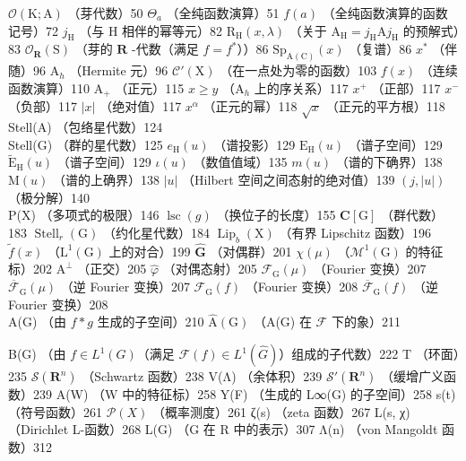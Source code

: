 \(\mathcal{O}(\mathrm{K};\mathrm{A})\) （芽代数）50 \(\Theta_{a}\) （全纯函数演算）51 \(f(a)\) （全纯函数演算的函数记号）72 \(j_{\mathrm{H}}\) （与 H 相伴的幂等元）82 \(\mathrm{R_H}(x,\lambda)\) （关于 \(\mathrm{A_H} = j_{\mathrm{H}}\mathrm{A}j_{\mathrm{H}}\) 的预解式）83 \(\mathcal{O}_{\mathbf{R}}(\mathrm{S})\) （芽的 \(\mathbf{R}\) -代数（满足 \(f = f^{*}\)））86 \(\mathrm{Sp}_{\mathrm{A(C)}}(x)\) （复谱）86 \(x^{*}\) （伴随）96 \(\mathrm{A}_h\) （Hermite 元）96 \(\mathcal{C}'(\mathrm{X})\) （在一点处为零的函数）103 \(f(x)\) （连续函数演算）110 \(\mathrm{A}_{+}\) （正元）115 \(x \geqslant y\) （\(\mathrm{A}_h\) 上的序关系）117 \(x^{+}\) （正部）117 \(x^{-}\) （负部）117 \(|x|\) （绝对值）117 \(x^{\alpha}\) （正元的幂）118 \(\sqrt{x}\) （正元的平方根）118\\
Stell(A) （包络星代数）124\\
Stell(G) （群的星代数）125 \(e_{\mathrm{H}}(u)\) （谱投影）129 \(\mathrm{E_H}(u)\) （谱子空间）129 \(\widetilde{\mathrm{E}}_{\mathrm{H}}(u)\) （谱子空间）129 \(\iota(u)\) （数值值域）135 \(m(u)\) （谱的下确界）138 \(\mathrm{M}(u)\) （谱的上确界）138 \(|u|\) （Hilbert 空间之间态射的绝对值）139 \((j,|u|)\) （极分解）140\\
P(X) （多项式的极限）146 \(\operatorname{lsc}(g)\) （换位子的长度）155 \(\mathbf{C}[\mathrm{G}]\) （群代数）183 \(\operatorname{Stell}_r(\mathrm{G})\) （约化星代数）184 \(\operatorname{Lip}_b(\mathrm{X})\) （有界 Lipschitz 函数）196 \(\widetilde{f}(x)\) （\(\mathrm{L}^1 (\mathrm{G})\) 上的对合）199 \(\widehat{\mathbf{G}}\) （对偶群）201 \(\chi (\mu)\) （\(\mathcal{M}^1 (\mathrm{G})\) 的特征标）202 \(\mathrm{A}^{\perp}\) （正交）205 \(\widehat{\varphi}\) （对偶态射）205 \(\mathcal{F}_{\mathrm{G}}(\mu)\) （Fourier 变换）207 \(\overline{\mathcal{F}}_{\mathrm{G}}(\mu)\) （逆 Fourier 变换）207 \(\mathcal{F}_{\mathrm{G}}(f)\) （Fourier 变换）208 \(\overline{\mathcal{F}}_{\mathrm{G}}(f)\) （逆 Fourier 变换）208\\
A(G) （由 \(f*g\) 生成的子空间）210 \(\widehat{\mathrm{A}}(\mathrm{G})\) （A(G) 在 \(\mathcal{F}\) 下的象）211

B(G) （由 \(f \in L^{1}(G)\)（满足 \(\mathcal{F}(f) \in L^{1}(\widehat{G})\)）组成的子代数）222 T （环面）235 \(\mathcal{S}(\mathbf{R}^{n})\) （Schwartz 函数）238 V(Λ) （余体积）239 \(\mathcal{S}'(\mathbf{R}^{n})\) （缓增广义函数）239 A(W) （W 中的特征标）258 Y(F) （生成的 L∞(G) 的子空间）258 s(t) （符号函数）261 \(\mathcal{P}(X)\) （概率测度）261 ζ(s) （zeta 函数）267 L(s, χ) （Dirichlet L-函数）268 L(G) （G 在 R 中的表示）307 Λ(n) （von Mangoldt 函数）312

